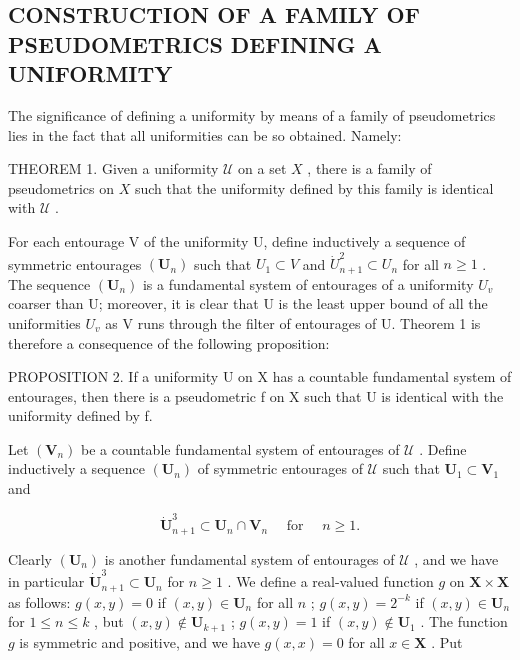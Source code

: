 \subsection{CONSTRUCTION OF A FAMILY OF PSEUDOMETRICS DEFINING A UNIFORMITY}

The significance of defining a uniformity by means of a family of pseudometrics lies in the fact that all uniformities can be so obtained. Namely:

THEOREM 1. Given a uniformity \(\mathcal{U}\) on a set \(X\) , there is a family of pseudometrics on \(X\) such that the uniformity defined by this family is identical with \(\mathcal{U}\) .

For each entourage V of the uniformity U, define inductively a sequence of symmetric entourages \((\mathbf{U}_{n})\) such that \(U_{1} \subset V\) and \(\dot{U}_{n+1}^{2} \subset U_{n}\) for all \(n \geqslant 1\) . The sequence \((\mathbf{U}_{n})\) is a fundamental system of entourages of a uniformity \(U_{v}\) coarser than U; moreover, it is clear that U is the least upper bound of all the uniformities \(U_{v}\) as V runs through the filter of entourages of U. Theorem 1 is therefore a consequence of the following proposition:

PROPOSITION 2. If a uniformity U on X has a countable fundamental system of entourages, then there is a pseudometric f on X such that U is identical with the uniformity defined by f.

Let \((\mathbf{V}_n)\) be a countable fundamental system of entourages of \(\mathcal{U}\) . Define inductively a sequence \((\mathbf{U}_n)\) of symmetric entourages of \(\mathcal{U}\) such that \(\mathbf{U}_1 \subset \mathbf{V}_1\) and

\[
\mathbf {\dot {U}} _ {n + 1} ^ {3} \subset \mathbf {U} _ {n} \cap \mathbf {V} _ {n} \quad \text {   for   } \quad n \geqslant 1.
\]

Clearly \((\mathbf{U}_n)\) is another fundamental system of entourages of \(\mathcal{U}\) , and we have in particular \(\dot{\mathbf{U}}_{n+1}^3 \subset \mathbf{U}_n\) for \(n \geqslant 1\) . We define a real-valued function \(g\) on \(\mathbf{X} \times \mathbf{X}\) as follows: \(g(x, y) = 0\) if \((x, y) \in \mathbf{U}_n\) for all \(n\) ; \(g(x, y) = 2^{-k}\) if \((x, y) \in \mathbf{U}_n\) for \(1 \leqslant n \leqslant k\) , but \((x, y) \notin \mathbf{U}_{k+1}\) ; \(g(x, y) = 1\) if \((x, y) \notin \mathbf{U}_1\) . The function \(g\) is symmetric and positive, and we have \(g(x, x) = 0\) for all \(x \in \mathbf{X}\) . Put

